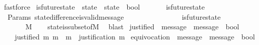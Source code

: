 \begin{isabellebody}
\ fastforce%
\endisatagproof
{\isafoldproof}%
%
\isadelimproof
\isanewline
%
\endisadelimproof
\isanewline
\isanewline
{}\isamarkupfalse%
\ is{\isacharunderscore}future{\isacharunderscore}state\ {\isacharcolon}{\isacharcolon}\ {\isachardoublequoteopen}{\isacharparenleft}state\ {\isacharasterisk}\ state{\isacharparenright}\ {\isasymRightarrow}\ bool{\isachardoublequoteclose}\isanewline
\ \ \isanewline
\ \ \ \ {\isachardoublequoteopen}is{\isacharunderscore}future{\isacharunderscore}state\ {\isacharparenleft}{\isasymsigma}{}{\isacharcomma}\ {\isasymsigma}{}{\isacharparenright}\ {\isacharequal}\ {\isacharparenleft}{\isasymsigma}{}\ {\isasymsubseteq}\ {\isasymsigma}{}{\isacharparenright}{\isachardoublequoteclose}\isanewline
\isanewline
{}\isamarkupfalse%
\ {\isacharparenleft}\ Params{\isacharparenright}\ state{\isacharunderscore}difference{\isacharunderscore}is{\isacharunderscore}valid{\isacharunderscore}message\ {\isacharcolon}\isanewline
\ \ {\isachardoublequoteopen}{\isasymforall}\ {\isasymsigma}\ {\isasymsigma}{\isacharprime}{\isachardot}\ {\isasymsigma}\ {\isasymin}\ {\isasymSigma}\ {\isasymand}\ {\isasymsigma}{\isacharprime}\ {\isasymin}\ {\isasymSigma}\isanewline
\ \ {\isasymlongrightarrow}\ is{\isacharunderscore}future{\isacharunderscore}state{\isacharparenleft}{\isasymsigma}{\isacharcomma}\ {\isasymsigma}{\isacharprime}{\isacharparenright}\isanewline
\ \ {\isasymlongrightarrow}\ {\isasymsigma}{\isacharprime}\ {\isacharminus}\ {\isasymsigma}\ {\isasymsubseteq}\ M{\isachardoublequoteclose}\isanewline
%
\isadelimproof
\ \ %
\endisadelimproof
%
\isatagproof
{}\isamarkupfalse%
\ state{\isacharunderscore}is{\isacharunderscore}subset{\isacharunderscore}of{\isacharunderscore}M\ \isamarkupfalse%
\ blast%
\endisatagproof
{\isafoldproof}%
%
\isadelimproof
\isanewline
%
\endisadelimproof
\isanewline
\isanewline
{}\isamarkupfalse%
\ justified\ {\isacharcolon}{\isacharcolon}\ {\isachardoublequoteopen}message\ {\isasymRightarrow}\ message\ {\isasymRightarrow}\ bool{\isachardoublequoteclose}\isanewline
\ \ \isanewline
\ \ \ \ {\isachardoublequoteopen}justified\ m{}\ m{}\ {\isacharequal}\ {\isacharparenleft}m{}\ {\isasymin}\ justification\ m{}{\isacharparenright}{\isachardoublequoteclose}\isanewline
\isanewline
\isanewline
\isanewline
\isanewline
\isanewline
{}\isamarkupfalse%
\ equivocation\ {\isacharcolon}{\isacharcolon}\ {\isachardoublequoteopen}{\isacharparenleft}message\ {\isacharasterisk}\ message{\isacharparenright}\ {\isasymRightarrow}\ bool{\isachardoublequoteclose}\isanewline

\end{isabellebody}
